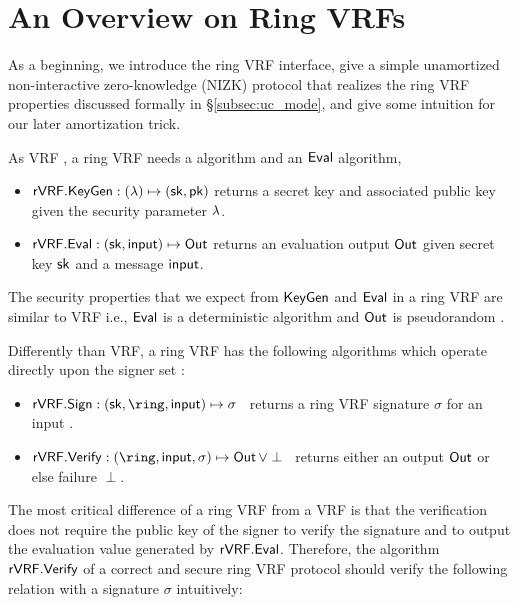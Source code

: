 \section{An Overview on Ring VRFs}
\label{sec:overview}

As a beginning, we introduce the ring VRF interface, give a simple
unamortized non-interactive zero-knowledge (NIZK) protocol that realizes the ring VRF properties discussed formally in \S\ref{subsec:uc_mode},
and give some intuition for our later amortization trick. 


As VRF \cite{vrf_micali}, a ring VRF needs a \KeyGen algorithm and an $ {\mathsf{Eval}} $ algorithm,

\begin{itemize}
	\item $ {\mathsf{rVRF}}.{\mathsf{KeyGen}}: (\lambda) \mapsto (\mathsf{sk}, \mathsf{pk}) $  returns a secret key \sk and
	associated public key \pk given the security parameter $ \lambda $.
	\item ${\mathsf{rVRF}}.{\mathsf{Eval}} : (\mathsf{sk},\mathsf{input}) \mapsto {\ensuremath{\mathsf{Out}}}$ returns an evaluation output $ {\mathsf{Out}} $ given secret key $ \mathsf{sk} $ and a message $ \mathsf{input} $.
\end{itemize}
The security properties that we expect from $ {\mathsf{KeyGen}} $ and $ {\mathsf{Eval}} $ in a ring VRF are similar to VRF i.e., $ {\mathsf{Eval}} $ is a deterministic algorithm and $ {\mathsf{Out}} $ is pseudorandom \cite{praos,ucvrf}.
%


Differently than VRF, a ring VRF has the following algorithms which operate directly
upon the signer set \ring:
\begin{itemize}
\item $\rVRF.\rSign : (\sk,\ring,\msg) \mapsto \sigma$ \,
    returns a ring VRF signature $\sigma$ for an input \msg.
\item $\rVRF.\rVerify : (\ring,\msg,\sigma) \mapsto \Out \, \lor \perp$ \,
    returns either an output ${\mathsf{Out}}$ or else failure $\perp$.
\end{itemize}

The most critical difference of a ring VRF from a VRF is that the verification does not require the public key of the signer to verify the signature and to output the evaluation value generated by $ {\mathsf{rVRF}}.{\mathsf{Eval}} $. Therefore, the algorithm $ {\mathsf{rVRF}}.{\mathsf{Verify}} $ of a correct and secure ring VRF protocol should verify the following relation with a signature $ \sigma $ intuitively:  


